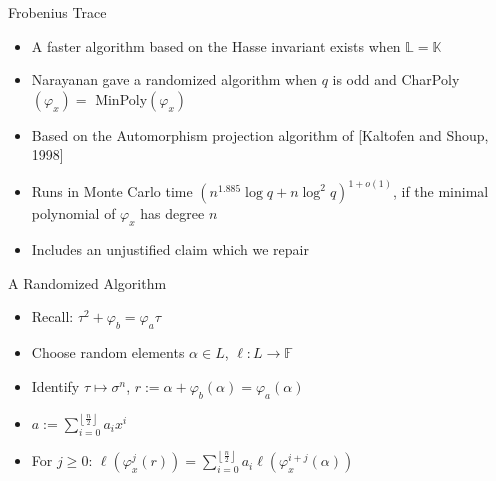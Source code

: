 \documentclass{beamer}
\newcommand{\f}{\mathbb{F}}
\begin{document}
\begin{frame}{Frobenius Trace}
\begin{itemize}

\item A faster algorithm based on the Hasse invariant exists when $\mathbb{L} = \mathbb{K}$
\item Narayanan gave a randomized algorithm when $q$ is odd and  CharPoly$(\varphi_x) = $ MinPoly$(\varphi_x)$
\item Based on the Automorphism projection algorithm of [Kaltofen and Shoup, 1998]
\item Runs in Monte Carlo time $(n^{1.885} \log q + n \log^2 q)^{1+o(1)}$,
  if the minimal polynomial of $\varphi_x$ has degree $n$
\item Includes an unjustified claim which we repair
\end{itemize}
\end{frame}





\begin{frame}{A Randomized Algorithm}

\begin{itemize}
    \item Recall: $\tau^2 + \varphi_b = \varphi_a \tau$
    \item Choose random elements $\alpha \in L$, $\ell : L \to \f$
    \item Identify $\tau \mapsto \sigma^n$, $r := \alpha + \varphi_b(\alpha) = \varphi_a(\alpha)$
    \item $a := \sum_{i=0}^{\left\lfloor \frac{n}{2} \right\rfloor}a_ix^i$
    \item For $j \geq 0$: $\ell(\varphi_x^j(r)) = \sum_{i = 0}^{\left\lfloor{\frac{n}{2}} \right\rfloor}a_i\ell(\varphi_x^{i+j}(\alpha))$
    \end{itemize}
    
    \end{frame}
    
\end{document}
